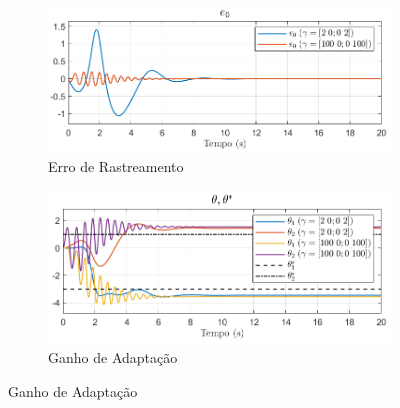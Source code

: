 \documentclass[10pt]{article}
\begin{document}
\begin{figure}[h!]
    \centering
    \begin{subfigure}[b]{0.3\textwidth}
        \centering
        \includegraphics[width=\textwidth]{img/fig01a.png}
        \caption{Erro de Rastreamento}
    \end{subfigure}
    \begin{subfigure}[b]{0.3\textwidth}
        \centering
        \includegraphics[width=\textwidth]{img/fig01b.png}
        \caption{Ganho de Adaptação}
    \end{subfigure}


\end{figure}
\end{document}
